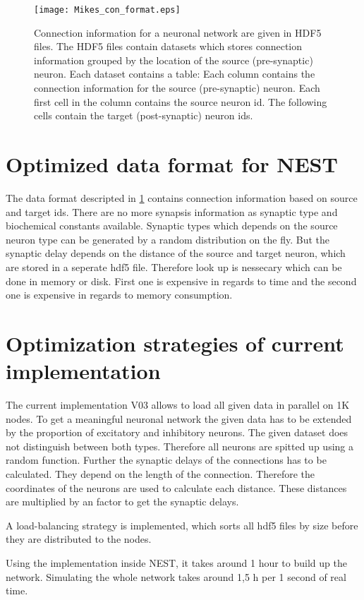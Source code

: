 \documentclass[a4paper]{article}
\begin{document}
\begin{figure}[h]
\centering
\texttt{[image: Mikes\_con\_format.eps]}
	\caption{Connection information for a neuronal network are given in HDF5 files.
The HDF5 files contain datasets which stores connection information grouped by the location of the source (pre-synaptic) neuron.
Each dataset contains a table:
Each column contains the connection information for the source (pre-synaptic) neuron.
Each first cell in the column contains the source neuron id.
The following cells contain the target (post-synaptic) neuron ids.}
	\label{Mikesformatcon}
\end{figure}

\section{Optimized data format for NEST}
The data format descripted in \ref{Mikesformatcon} contains connection information based on source and target ids.
There are no more synapsis information as synaptic type and biochemical constants available.
Synaptic types which depends on the source neuron type can be generated by a random distribution on the fly.
But the synaptic delay depends on the distance of the source and target neuron, which are stored in a seperate hdf5 file.
Therefore look up is nessecary which can be done in memory or disk.
First one is expensive in regards to time and the second one is expensive in regards to memory consumption.

\newpage
\section{Optimization strategies of current implementation}
The current implementation V03 allows to load all given data in parallel on 1K nodes.
To get a meaningful neuronal network the given data has to be extended by the proportion of excitatory and inhibitory neurons.
The given dataset does not distinguish between both types.
Therefore all neurons are spitted up using a random function.
Further the synaptic delays of the connections has to be calculated.
They depend on the length of the connection.
Therefore the coordinates of the neurons are used to calculate each distance.
These distances are multiplied by an factor to get the synaptic delays.

A load-balancing strategy is implemented, which sorts all hdf5 files by size before they are distributed to the nodes.

Using the implementation inside NEST, it takes around 1 hour to build up the network. Simulating the whole network takes around 1,5 h per 1 second of real time.
\end{document}
